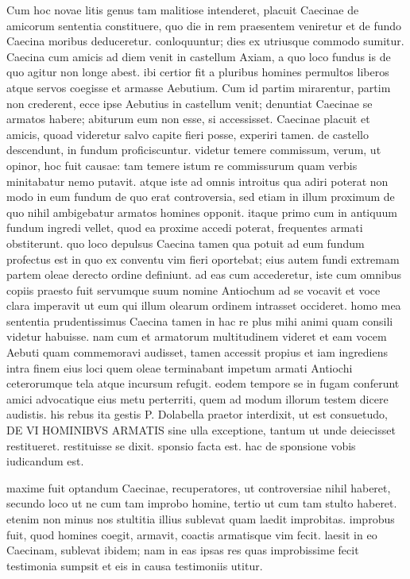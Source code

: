  Cum hoc novae litis genus tam malitiose intenderet, placuit Caecinae de amicorum sententia constituere, quo die in rem praesentem veniretur et de fundo Caecina moribus deduceretur. conloquuntur; dies ex utriusque commodo sumitur. Caecina cum amicis ad diem venit in castellum Axiam, a quo loco fundus is de quo agitur non longe abest. ibi certior fit a pluribus homines permultos liberos atque servos coegisse et armasse Aebutium. Cum id partim mirarentur, partim non crederent, ecce ipse Aebutius in castellum venit; denuntiat Caecinae se armatos habere; abiturum eum non esse, si accessisset. Caecinae placuit et amicis, quoad videretur salvo capite fieri posse, experiri tamen.  de castello descendunt, in fundum proficiscuntur. videtur temere commissum, verum, ut opinor, hoc fuit causae: tam temere istum re commissurum quam verbis minitabatur nemo putavit. atque iste ad omnis introitus qua adiri poterat non modo in eum fundum de quo erat controversia, sed etiam in illum proximum de quo nihil ambigebatur armatos homines opponit. itaque primo cum in antiquum fundum ingredi vellet, quod ea proxime accedi poterat, frequentes armati obstiterunt.  quo loco depulsus Caecina tamen qua potuit ad eum fundum profectus est in quo ex conventu vim fieri oportebat; eius autem fundi extremam partem oleae derecto ordine definiunt. ad eas cum accederetur, iste cum omnibus copiis praesto fuit servumque suum nomine Antiochum ad se vocavit et voce clara imperavit ut eum qui illum olearum ordinem intrasset occideret. homo mea sententia prudentissimus Caecina tamen in hac re plus mihi animi quam consili videtur habuisse. nam cum et armatorum multitudinem videret et eam vocem Aebuti quam commemoravi audisset, tamen accessit propius et iam ingrediens intra finem eius loci quem oleae terminabant impetum armati Antiochi ceterorumque tela atque incursum refugit. eodem tempore se in fugam conferunt amici advocatique eius metu perterriti, quem ad modum illorum testem dicere audistis.  his rebus ita gestis P. Dolabella praetor interdixit, ut est consuetudo, DE VI HOMINIBVS ARMATIS sine ulla exceptione, tantum ut unde deiecisset restitueret. restituisse se dixit. sponsio facta est. hac de sponsione vobis iudicandum est.

maxime fuit optandum Caecinae, recuperatores, ut controversiae nihil haberet, secundo loco ut ne cum tam improbo homine, tertio ut cum tam stulto haberet. etenim non minus nos stultitia illius sublevat quam laedit improbitas. improbus fuit, quod homines coegit, armavit, coactis armatisque vim fecit. laesit in eo Caecinam, sublevat ibidem; nam in eas ipsas res quas improbissime fecit testimonia sumpsit et eis in causa testimoniis utitur.

